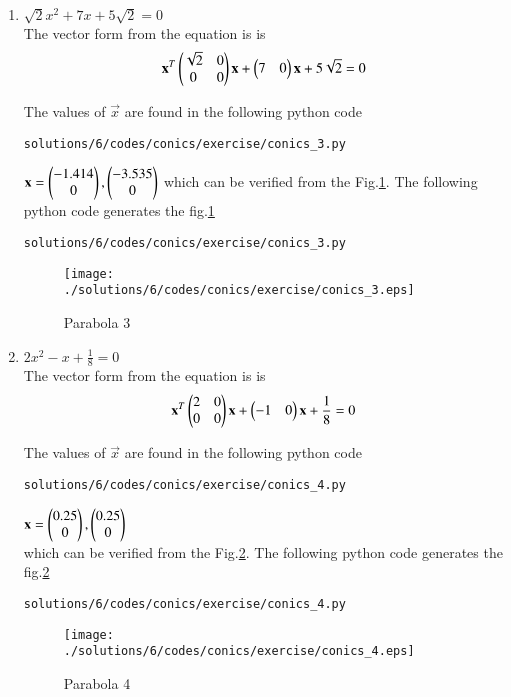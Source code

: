 \begin{enumerate}
\item $\sqrt{2}x^2+7x+5\sqrt{2}=0$ \\
The vector form from the equation is is
\begin{align}
\mathbf{x}^T\begin{pmatrix}\sqrt{2}&0\\0&0\end{pmatrix}\mathbf{x}+\begin{pmatrix}7&0\end{pmatrix}\mathbf{x}+5\sqrt{2}=0
\end{align}
 
The values of $\vec{x}$ are found in the following python code
\begin{lstlisting}
solutions/6/codes/conics/exercise/conics_3.py
\end{lstlisting}

$\mathbf{x}=\begin{pmatrix}-1.414\\0\end{pmatrix}, \begin{pmatrix}-3.535\\0\end{pmatrix}$
which can be verified from the Fig.\ref{fig:5.2.6_parabola_3}.
The following python code generates the fig.\ref{fig:5.2.6_parabola_3}
\begin{lstlisting}
solutions/6/codes/conics/exercise/conics_3.py
\end{lstlisting}
\begin{figure}[!ht]
\texttt{[image: ./solutions/6/codes/conics/exercise/conics\_3.eps]}
\caption{Parabola 3}
\label{fig:5.2.6_parabola_3}
\end{figure} 

\item $2x^2-x+\frac{1}{8}=0$ \\
The vector form from the equation is is
\begin{align}
\mathbf{x}^T\begin{pmatrix}2&0\\0&0\end{pmatrix}\mathbf{x}+\begin{pmatrix}-1&0\end{pmatrix}\mathbf{x}+\frac{1}{8}=0
\end{align}

The values of $\vec{x}$ are found in the following python code
\begin{lstlisting}
solutions/6/codes/conics/exercise/conics_4.py
\end{lstlisting}

$\mathbf{x}=\begin{pmatrix}0.25\\0\end{pmatrix}, \begin{pmatrix}0.25\\0\end{pmatrix}$ \\
which can be verified from the Fig.\ref{fig:5.2.6_parabola_4}.
The following python code generates the fig.\ref{fig:5.2.6_parabola_4}
\begin{lstlisting}
solutions/6/codes/conics/exercise/conics_4.py
\end{lstlisting}
\begin{figure}[!ht]
\texttt{[image: ./solutions/6/codes/conics/exercise/conics\_4.eps]}
\caption{Parabola 4}
\label{fig:5.2.6_parabola_4}
\end{figure} 



\end{enumerate}

